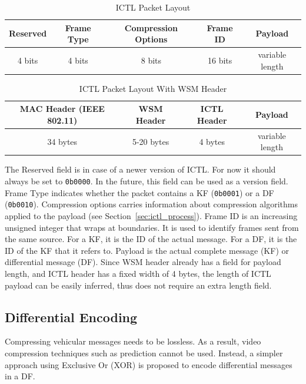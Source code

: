 \documentclass[12pt]{report}
\begin{document}
\begin{table}[h]
  \begin{center}
    \begin{tabular}{|c|c|c|c|c|}
      \hline
      Reserved & Frame Type & Compression Options & Frame ID & Payload \\\hline
      4 bits   &  4 bits    & 8 bits              & 16 bits  & variable length \\\hline
    \end{tabular}
    \caption{\label{tab:ictl_layout}ICTL Packet Layout}
  \end{center}
\end{table}
\begin{table}[h]
  \begin{center}
    \begin{tabular}{|c|c|c|c|}
      \hline
      MAC Header (IEEE 802.11) & WSM Header & ICTL Header & Payload \\\hline
      34 bytes            & 5-20 bytes & 4 bytes     &  variable length \\\hline
    \end{tabular}
    \caption{\label{tab:ictl_layout_wsm}ICTL Packet Layout With WSM Header}
  \end{center}
\end{table}

The Reserved field is in case of a newer version of ICTL. For now it should always be set to \texttt{0b0000}. In the future, this field can be used as a version field. Frame Type indicates whether the packet contains a KF (\texttt{0b0001}) or a DF (\texttt{0b0010}). Compression options carries information about compression algorithms applied to the payload (see Section~\ref{sec:ictl_process}). Frame ID is an increasing unsigned integer that wraps at boundaries. It is used to identify frames sent from the same source. For a KF, it is the ID of the actual message. For a DF, it is the ID of the KF that it refers to. Payload is the actual complete message (KF) or differential message (DF). Since WSM header already has a field for payload length, and ICTL header has a fixed width of 4 bytes, the length of ICTL payload can be easily inferred, thus does not require an extra length field.

\subsection{Differential Encoding}
\label{sec:ictl_diff}

Compressing vehicular messages needs to be lossless. As a result, video compression techniques such as prediction cannot be used. Instead, a simpler approach using Exclusive Or (XOR) is proposed to encode differential messages in a DF.
\end{document}
